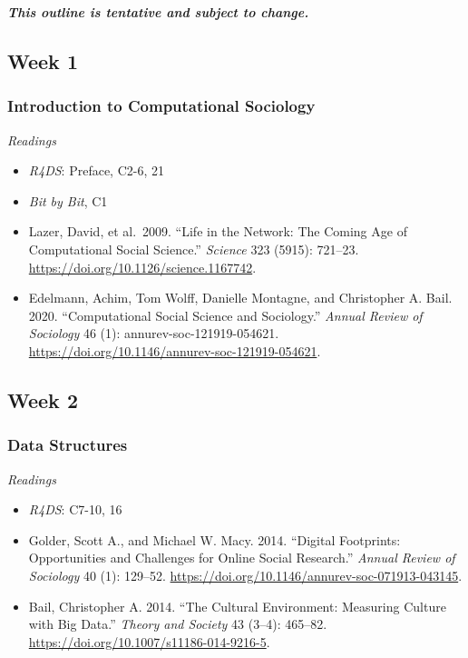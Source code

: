 \documentclass[
  10pt,
]{article}
\providecommand{\tightlist}{%
  \setlength{\itemsep}{0pt}\setlength{\parskip}{0pt}}
\begin{document}
\textbf{\emph{This outline is tentative and subject to change.}}

\hypertarget{week-1}{%
\subsection{Week 1}\label{week-1}}

\hypertarget{introduction-to-computational-sociology}{%
\subsubsection{Introduction to Computational
Sociology}\label{introduction-to-computational-sociology}}

\emph{Readings}

\begin{itemize}
\tightlist
\item
  \emph{R4DS}: Preface, C2-6, 21
\item
  \emph{Bit by Bit}, C1
\item
  Lazer, David, et al.~2009. ``Life in the Network: The Coming Age of
  Computational Social Science.'' \emph{Science} 323 (5915): 721--23.
  \url{https://doi.org/10.1126/science.1167742}.
\item
  Edelmann, Achim, Tom Wolff, Danielle Montagne, and Christopher A.
  Bail. 2020. ``Computational Social Science and Sociology.''
  \emph{Annual Review of Sociology} 46 (1): annurev-soc-121919-054621.
  \url{https://doi.org/10.1146/annurev-soc-121919-054621}.
\end{itemize}

\hypertarget{week-2}{%
\subsection{Week 2}\label{week-2}}

\hypertarget{data-structures}{%
\subsubsection{Data Structures}\label{data-structures}}

\emph{Readings}

\begin{itemize}
\tightlist
\item
  \emph{R4DS}: C7-10, 16
\item
  Golder, Scott A., and Michael W. Macy. 2014. ``Digital Footprints:
  Opportunities and Challenges for Online Social Research.''
  \emph{Annual Review of Sociology} 40 (1): 129--52.
  \url{https://doi.org/10.1146/annurev-soc-071913-043145}.
\item
  Bail, Christopher A. 2014. ``The Cultural Environment: Measuring
  Culture with Big Data.'' \emph{Theory and Society} 43 (3--4): 465--82.
  \url{https://doi.org/10.1007/s11186-014-9216-5}.
\end{itemize}
\end{document}
